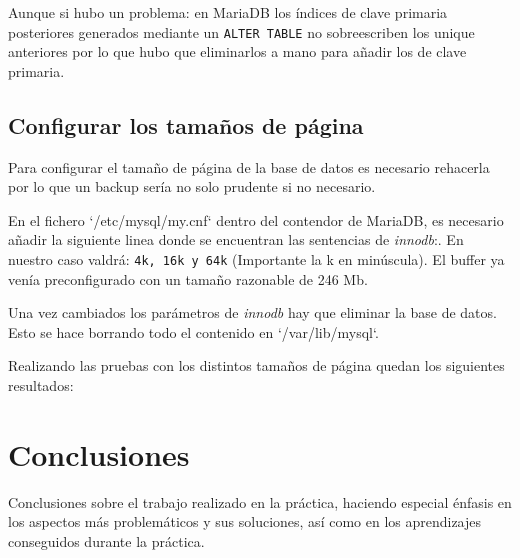 \documentclass[a4paper, 11pt, oneside]{article} %
\begin{document}
Aunque si hubo un problema: en MariaDB los índices de clave primaria posteriores generados mediante un \texttt{ALTER TABLE} no sobreescriben los unique anteriores por lo que hubo que eliminarlos a mano para añadir los de clave primaria.




\subsection{Configurar los tamaños de página}

Para configurar el tamaño de página de la base de datos es necesario rehacerla por lo que un backup sería no solo prudente si no necesario.

En el fichero `/etc/mysql/my.cnf` dentro del contendor de MariaDB, es necesario añadir la siguiente linea donde se encuentran las sentencias de \emph{innodb}:. En nuestro caso  valdrá: \texttt{4k, 16k y 64k} (Importante la k en minúscula). El buffer ya venía preconfigurado con un tamaño razonable de 246 Mb.

Una vez cambiados los parámetros de \emph{innodb} hay que eliminar la base de datos. Esto se hace borrando todo el contenido en `/var/lib/mysql`.

Realizando las pruebas con los distintos tamaños de página quedan los siguientes resultados:



\newpage


\section{Conclusiones}

Conclusiones sobre el trabajo realizado en la práctica, haciendo especial énfasis en los aspectos más problemáticos y sus soluciones, así como en los aprendizajes conseguidos durante la práctica.
\end{document}
